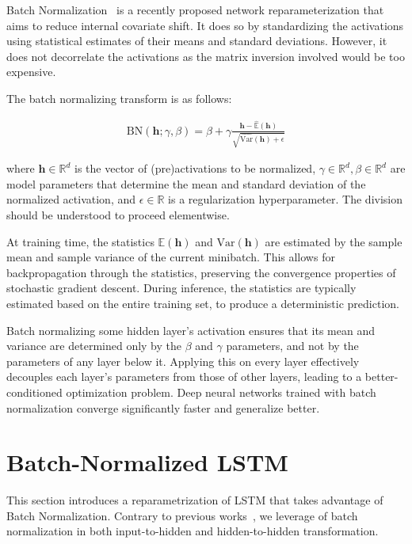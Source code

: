 \documentclass{article} %
\newcommand{\vect}[1]{\mathbf{#1}}
\newcommand{\reals}{\mathbb{R}}
\begin{document}
Batch Normalization~\cite{batchnorm} is a recently proposed network reparameterization that aims to reduce internal covariate shift.
It does so by standardizing the activations using statistical estimates of their means and standard deviations.
However, it does not decorrelate the activations as the matrix inversion involved would be too expensive.

The batch normalizing transform is as follows:

\begin{align}
\mathrm{BN}(\vect{h}; \gamma, \beta) =
  \beta + \gamma
  \frac{\vect{h} -   \widehat{\mathbb{E  }}(\vect{h})}
       {       \sqrt{\widehat{\mathrm{Var}}(\vect{h}) + \epsilon}}
\end{align}

where $\vect{h} \in \reals^d$ is the vector of (pre)activations to be normalized, $\gamma \in \reals^d, \beta \in \reals^d$ are model parameters that determine the mean and standard deviation of the normalized activation, and $\epsilon \in \reals$ is a regularization hyperparameter.
The division should be understood to proceed elementwise.

At training time, the statistics $\mathbb{E}(\vect{h})$ and $\mathrm{Var}(\vect{h})$ are estimated by the sample mean and sample variance of the current minibatch.
This allows for backpropagation through the statistics, preserving the convergence properties of stochastic gradient descent.
During inference, the statistics are typically estimated based on the entire training set, to produce a deterministic prediction.

Batch normalizing some hidden layer's activation ensures that its mean and variance are determined only by the $\beta$ and $\gamma$ parameters, and not by the parameters of any layer below it.
Applying this on every layer effectively decouples each layer's parameters from those of other layers, leading to a better-conditioned optimization problem.
Deep neural networks trained with batch normalization converge significantly faster and generalize better.


\section{Batch-Normalized LSTM}
\label{sec:recurrent-batch-normalization}

This section introduces a reparametrization of LSTM that takes advantage
of Batch Normalization. Contrary to previous works~\cite{cesar, baidu}, we leverage of batch normalization in both input-to-hidden and hidden-to-hidden transformation.
\end{document}
